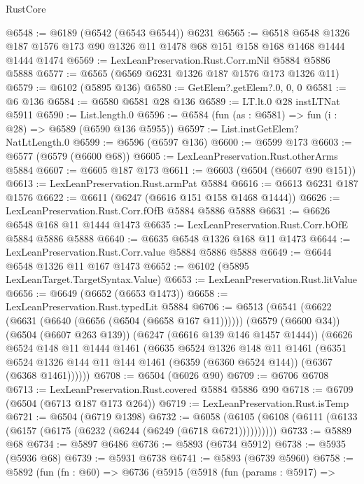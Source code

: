 \begin{lexlean}{RustCore}
\begin{coremodule}
@6548 := @6189 (@6542 (@6543 @6544)) @6231
@6565 := @6518
    @6548
    @1326
    @187
    @1576
    @173
    @90
    @1326
    @11
    @1478
    @68
    @151
    @158
    @168
    @1468
    @1444
    @1444
    @1474
@6569 := LexLeanPreservation.Rust.Corr.mNil @5884 @5886 @5888
@6577 := @6565 (@6569 @6231 @1326 @187 @1576 @173 @1326 @11)
@6579 := @6102 (@5895 @136)
@6580 := GetElem?.getElem?.{0, 0, 0}
@6581 := @6 @136
@6584 := @6580 @6581 @28 @136
@6589 := LT.lt.{0} @28 instLTNat @5911
@6590 := List.length.{0}
@6596 := @6584 (fun (as : @6581) => fun (i : @28) => @6589 (@6590 @136 @5955))
@6597 := List.instGetElem?NatLtLength.{0}
@6599 := @6596 (@6597 @136)
@6600 := @6599 @173
@6603 := @6577 (@6579 (@6600 @68))
@6605 := LexLeanPreservation.Rust.otherArms @5884
@6607 := @6605 @187 @173
@6611 := @6603 (@6504 (@6607 @90 @151))
@6613 := LexLeanPreservation.Rust.armPat @5884
@6616 := @6613 @6231 @187 @1576
@6622 := @6611 (@6247 (@6616 @151 @158 @1468 @1444))
@6626 := LexLeanPreservation.Rust.Corr.fOfB @5884 @5886 @5888
@6631 := @6626 @6548 @168 @11 @1444 @1473
@6635 := LexLeanPreservation.Rust.Corr.bOfE @5884 @5886 @5888
@6640 := @6635 @6548 @1326 @168 @11 @1473
@6644 := LexLeanPreservation.Rust.Corr.value @5884 @5886 @5888
@6649 := @6644 @6548 @1326 @11 @167 @1473
@6652 := @6102 (@5895 LexLeanTarget.TargetSyntax.Value)
@6653 := LexLeanPreservation.Rust.litValue
@6656 := @6649 (@6652 (@6653 @1473))
@6658 := LexLeanPreservation.Rust.typedLit @5884
@6706 := @6513
    (@6541
      (@6622 (@6631 (@6640 (@6656 (@6504 (@6658 @167 @11))))))
      (@6579 (@6600 @34))
      (@6504 (@6607 @263 @139))
      (@6247 (@6616 @139 @146 @1457 @1444))
      (@6626
        @6524
        @148
        @11
        @1444
        @1461
        (@6635
          @6524
          @1326
          @148
          @11
          @1461
          (@6351
            @6524
            @1326
            @144
            @11
            @144
            @1461
            (@6359 (@6360 @6524 @144))
            (@6367 (@6368 @1461))))))
@6708 := @6504 (@6026 @90)
@6709 := @6706 @6708
@6713 := LexLeanPreservation.Rust.covered @5884 @5886 @90
@6718 := @6709 (@6504 (@6713 @187 @173 @264))
@6719 := LexLeanPreservation.Rust.isTemp
@6721 := @6504 (@6719 @1398)
@6732 := @6058 (@6105 (@6108 (@6111 (@6133 (@6157 (@6175 (@6232 (@6244 (@6249 (@6718 @6721))))))))))
@6733 := @5889 @68
@6734 := @5897 @6486
@6736 := @5893 (@6734 @5912)
@6738 := @5935 (@5936 @68)
@6739 := @5931 @6738
@6741 := @5893 (@6739 @5960)
@6758 := @5892
    (fun (fn : @60) =>
    @6736
      (@5915
        (@5918
          (fun (params : @5917) =>

\end{coremodule}
\end{lexlean}
